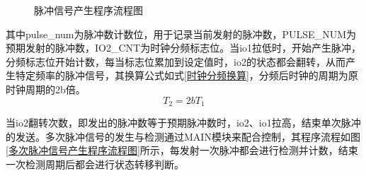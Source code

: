         

\begin{figure}[ht]
	\centering
	\caption{脉冲信号产生程序流程图}
	\label{脉冲信号产生程序流程图}
\end{figure}

    其中pulse\_num为脉冲数计数位，用于记录当前发射的脉冲数，PULSE\_NUM为预期发射的脉冲数，IO2\_CNT为时钟分频标志位。当io1拉低时，开始产生脉冲，分频标志位开始计数，每当标志位累加到设定值时，io2的状态都会翻转，从而产生特定频率的脉冲信号，其换算公式如式\ref{时钟分频换算}，分频后时钟的周期为原时钟周期的2b倍。
    \begin{equation}
        T_2=2bT_1
    \label{时钟分频换算}
    \end{equation}\par
    当io2翻转次数，即发出的脉冲数等于预期脉冲数时，io2、io1拉高，结束单次脉冲的发送。多次脉冲信号的发生与检测通过MAIN模块来配合控制，其程序流程如图\ref{多次脉冲信号产生程序流程图}所示，每发射一次脉冲都会进行检测并计数，结束一次检测周期后都会进行状态转移判断。
    

